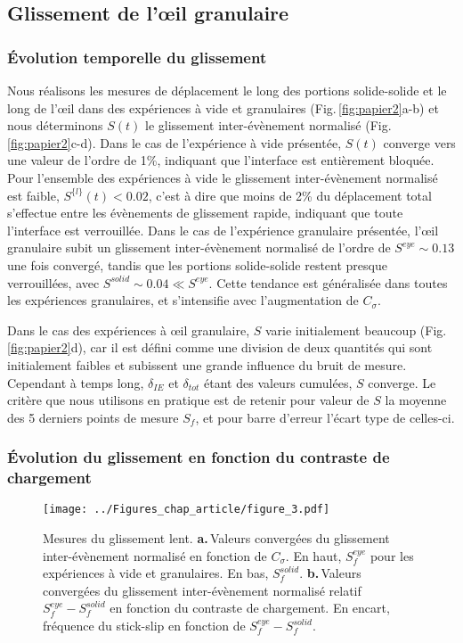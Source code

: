 \subsection{Glissement de l'œil granulaire}

\subsubsection{Évolution temporelle du glissement}


Nous réalisons les mesures de déplacement le long des portions solide-solide et le long de l'œil dans des expériences à vide et granulaires (Fig.\,\ref{fig:papier2}a-b) et nous déterminons $S(t)$ le glissement inter-évènement normalisé (Fig.\,\ref{fig:papier2}c-d). Dans le cas de l'expérience à vide présentée, $S(t)$ converge vers une valeur de l'ordre de 1\%, indiquant que l'interface est entièrement bloquée. Pour l'ensemble des expériences à vide le glissement inter-évènement normalisé est faible, $S^{\{l\}}(t)<0.02$, c'est à dire que moins de 2\% du déplacement total s'effectue entre les évènements de glissement rapide, indiquant que toute l'interface est verrouillée. Dans le cas de l'expérience granulaire présentée, l'œil granulaire subit un glissement inter-évènement normalisé de l'ordre de $S^{eye}\sim 0.13$ une fois convergé, tandis que les portions solide-solide restent presque verrouillées, avec $S^{solid}\sim 0.04\ll S^{eye}$. Cette tendance est généralisée dans toutes les expériences granulaires, et s'intensifie avec l'augmentation de $C_\sigma$.

Dans le cas des expériences à œil granulaire, $S$ varie initialement beaucoup (Fig.\,\ref{fig:papier2}d), car il est défini comme une division de deux quantités qui sont initialement faibles et subissent une grande influence du bruit de mesure. Cependant à temps long, $\delta_{IE}$ et $\delta_{tot}$ étant des valeurs cumulées, $S$ converge. Le critère que nous utilisons en pratique est de retenir pour valeur de $S$ la moyenne des 5 derniers points de mesure $S_f$, et pour barre d'erreur l'écart type de celles-ci.




\subsubsection[Évolution du glissement en fonction de $C_\sigma$]{Évolution du glissement en fonction du contraste de chargement}

\begin{figure}[htb]
\centering
\texttt{[image: ../Figures\_chap\_article/figure\_3.pdf]}
\caption[Mesures du glissement lent]{Mesures du glissement lent. \textbf{a.}\,Valeurs convergées du glissement inter-évènement normalisé en fonction de $C_\sigma$. En haut, $S_f^{eye}$ pour les expériences à vide et granulaires. En bas, $S_f^{solid}$. \textbf{b.}\,Valeurs convergées du glissement inter-évènement normalisé relatif $S_f^{eye}-S_f^{solid}$ en fonction du contraste de chargement. En encart, fréquence du stick-slip en fonction de $S_f^{eye}-S_f^{solid}$.}
\label{fig:papier3}
\end{figure}




